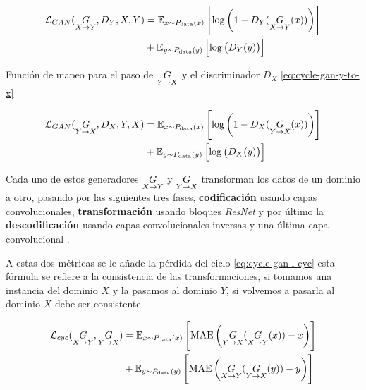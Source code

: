 \begin{equation}
    \begin{split}
        \mathcal{L}_{GAN} (\underset{X\rightarrow{}Y}{G}, D_{Y}, X, Y)
        & = \mathbb{E}_{x\sim{}P_{\text{data}}(x)} \left[\log{\left(1 - D_{Y}(\underset{X\rightarrow{}Y}{G}(x))\right)}\right]     \\
        & + \mathbb{E}_{y\sim{}P_{\text{data}}(y)} \left[\log{\left(D_{Y}(y)\right)}\right]                   \\
    \end{split}
    \label{eq:cycle-gan-x-to-y}
\end{equation}

Función de mapeo para el paso de ${\underset{Y\rightarrow{}X}{G}}$ y el discriminador $D_{X}$ \ref{eq:cycle-gan-y-to-x}

\begin{equation}
    \begin{split}
        \mathcal{L}_{GAN} (\underset{Y\rightarrow{}X}{G}, D_{X}, Y, X)
        & = \mathbb{E}_{x\sim{}P_{\text{data}}(x)} \left[\log{\left(1 - D_{X}(\underset{Y\rightarrow{}X}{G}(x))\right)}    \right]     \\
        & + \mathbb{E}_{y\sim{}P_{\text{data}}(y)} \left[\log{\left(    D_{X}(y)          \right)}    \right]     \\
    \end{split}
    \label{eq:cycle-gan-y-to-x}
\end{equation}

Cada uno de estos generadores ${\underset{X\rightarrow{}Y}{G}}$ y ${\underset{Y\rightarrow{}X}{G}}$ transforman los datos de un dominio a otro, pasando por las siguientes tres fases, \textbf{codificación} usando capas convolucionales, \textbf{transformación} usando bloques \textit{ResNet} y por último la \textbf{descodificación} usando capas convolucionales inversas y una última capa convolucional \cite{CycleGAN-blog}.

A estas dos métricas se le añade la pérdida del ciclo \ref{eq:cycle-gan-l-cyc} esta fórmula se refiere a la consistencia de las transformaciones, si tomamos una instancia del dominio ${X}$ y la pasamos al dominio ${Y}$, si volvemos a pasarla al dominio ${X}$ debe ser consistente.

\begin{equation}
    \begin{split}
        \mathcal{L}_{cyc} (\underset{X\rightarrow{}Y}{G},\underset{Y\rightarrow{}X}{G})
        & = \mathbb{E}_{x\sim{}P_{\text{data}}(x)} \left[{\mathrm{MAE}\left(\underset{Y\rightarrow{}X}{G}(\underset{X\rightarrow{}Y}{G}(x)) - x\right)}\right] \\
        & + \mathbb{E}_{y\sim{}P_{\text{data}}(y)} \left[{\mathrm{MAE}\left(\underset{X\rightarrow{}Y}{G}(\underset{Y\rightarrow{}X}{G}(y)) - y\right)}\right] \\
    \end{split}
    \label{eq:cycle-gan-l-cyc}
\end{equation}


